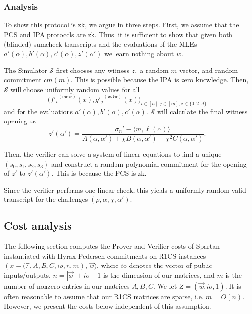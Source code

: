 \subsubsection{Analysis}
To show this protocol is zk, we argue in three steps. First, we assume that the PCS and IPA protocols are zk. Thus, it is sufficient to show that given both (blinded) sumcheck transcripts and the evaluations of the MLEs $a'(\alpha), b'(\alpha), c'(\alpha), z'(\alpha')$ we learn nothing about $w.$

The Simulator $\mathcal{S}$ first chooses any witness $z,$ a random $m$ vector, and random commitment $cm(m).$ This is possible because the IPA is zero knowledge. Then, $\mathcal{S}$ will choose uniformly random values for all $$\big( {f'_i}^{(\textsf{inner})}(x), {g'_j}^{(\textsf{outer})}(x) \big)_{i \in [n], j \in [m], x \in \{0, 2..d\}}$$ and for the evaluations $a'(\alpha), b'(\alpha), c'(\alpha).$ $\mathcal{S}$ will calculate the final witness opening as
$$ z'(\alpha') = \frac{\sigma_n' - \big\langle m, \ell(\alpha) \big\rangle}{A(\alpha, \alpha') + \chi B(\alpha, \alpha') + \chi^2 C(\alpha, \alpha')}. $$

Then, the verifier can solve a system of linear equations to find a unique $(s_0, s_1, s_2, s_3)$ and construct a random polynomial commitment for the opening of $z'$ to $z'(\alpha').$ This is because the PCS is zk.

Since the verifier performs one linear check, this yields a uniformly random valid transcript for the challenges $(\rho, \alpha, \chi, \alpha').$

\subsection{Cost analysis}

The following section computes the Prover and Verifier costs of Spartan instantiated with Hyrax Pedersen commitments on R1CS instances $(x = \big(\mathbb{F}, A, B, C, io, n, m),\, \vec{w})$, 
where $io$ denotes the vector of public inputs/outputs, $n = |\vec{w}| + io + 1$ is the dimension of our matrices, 
and $m$ is the number of nonzero entries in our matrices $A,B,C$. We let $Z = (\vec{w}, io, 1)$. 
It is often reasonable to assume that our R1CS matrices are sparse, i.e. $m = O(n)$. However, we present the costs below independent of this assumption.

